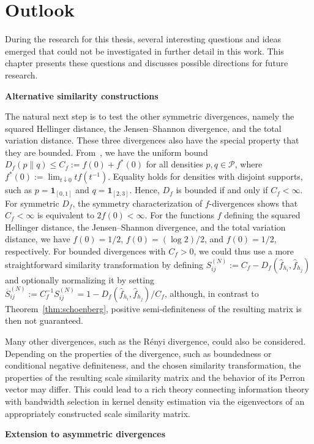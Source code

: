 \chapter{Outlook}\label{chap:outlook}

During the research for this thesis, several interesting questions and ideas emerged that could not be investigated in further detail in this work. This chapter presents these questions and discusses possible directions for future research.

\textbf{Alternative similarity constructions}

The natural next step is to test the other symmetric divergences, namely the squared Hellinger distance, the Jensen--Shannon divergence, and the total variation distance. These three divergences also have the special property that they are bounded. From~\cite[Equation~(125)]{sason_f-divergence_2016}, we have the uniform bound $D_f(p\|q)\le C_f:=f(0)+f^{\ast}(0)$ for all densities $p,q\in\mathcal{P}$, where $f^{\ast}(0):=\lim_{t\downarrow0}tf(t^{-1})$. Equality holds for densities with disjoint supports, such as $p=\mathbf{1}_{[0,1]}$ and $q=\mathbf{1}_{[2,3]}$. Hence, $D_f$ is bounded if and only if $C_f<\infty$. For symmetric $D_f$, the symmetry characterization of $f$-divergences shows that $C_f<\infty$ is equivalent to $2f(0)<\infty$. For the functions $f$ defining the squared Hellinger distance, the Jensen--Shannon divergence, and the total variation distance, we have $f(0)=1/2$, $f(0)=(\log{2})/2$, and $f(0)=1/2$, respectively. For bounded divergences with $C_f>0$, we could thus use a more straightforward similarity transformation by defining $S^{(N)}_{ij}:=C_f-D_f(\hat{f}_{h_i},\hat{f}_{h_j})$ and optionally normalizing it by setting $\overline{S}^{(N)}_{ij}:=C_f^{-1}S^{(N)}_{ij}=1-D_f(\hat{f}_{h_i},\hat{f}_{h_j})/C_f$, although, in contrast to Theorem~\ref{thm:schoenberg}, positive semi-definiteness of the resulting matrix is then not guaranteed.

Many other divergences, such as the Rényi divergence, could also be considered. Depending on the properties of the divergence, such as boundedness or conditional negative definiteness, and the chosen similarity transformation, the properties of the resulting scale similarity matrix and the behavior of its Perron vector may differ. This could lead to a rich theory connecting information theory with bandwidth selection in kernel density estimation via the eigenvectors of an appropriately constructed scale similarity matrix.

\textbf{Extension to asymmetric divergences}

